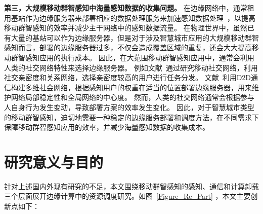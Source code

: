 

\textbf{第三，大规模移动群智感知中海量感知数据的收集问题。}
在边缘网络中，通常租用基站作为边缘服务器来部署相应的数据处理服务来加速感知数据处理~\cite{DBLP:journals/fgcs/TarnebergMWTEKE17,DBLP:journals/ton/ChenJLF16,DBLP:conf/IEEEcloud/HabakAHZ15}，以提高移动群智感知的效率并减少主干网络中的感知数据流量。
在物理世界中，虽然已有大量的基站可以作为边缘服务器，但是对于涉及智慧城市应用的大规模移动群智感知而言，部署的边缘服务器过多，不仅会造成覆盖区域的重复，还会大大提高移动群智感知应用的执行成本。
因此，在大范围移动群智感知应用中，通常会利用人类的社交网络特性来选择边缘服务器。
例如文献~通过研究移动社交网络，利用社交亲密度和关系网络，选择亲密度较高的用户进行任务分发。
文献~利用D2D通信构建多维社会网络，根据感知用户的权重在适当的位置部署边缘服务器，用来维护网络局部稳定性和全局网络的中心度。
然而，人类的社交网络通常会根据参与人自身行为发生变动，导致部署方案的效率发生变化。
因此，对于智慧城市类型的移动群智感知，迫切地需要一种稳定的边缘服务部署和调度方法，在不同需求下保障移动群智感知应用的效率，并减少海量感知数据的收集成本。


\section{研究意义与目的}

针对上述国内外现有研究的不足，本文围绕移动群智感知的感知、通信和计算卸载三个层面展开边缘计算中的资源调度研究。如图~\ref{Figure_Re_Part} ，本文主要创新点如下：

